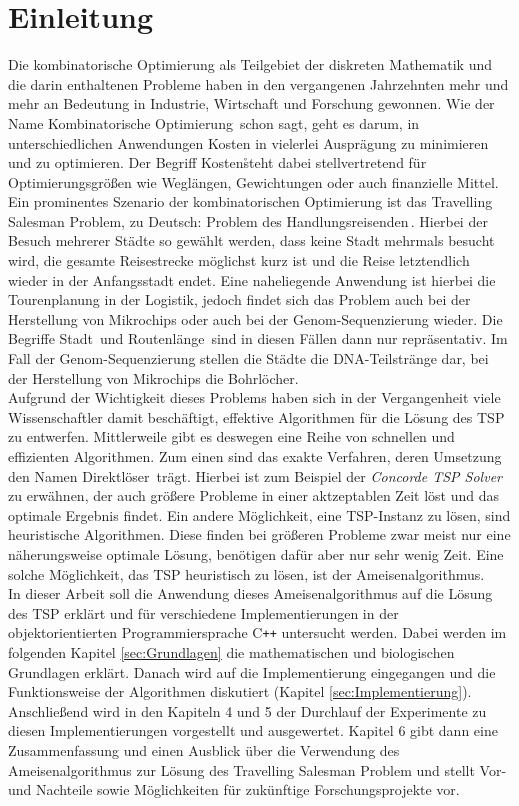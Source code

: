\documentclass[doktyp=barbeit, sprache=german]{TUBAFarbeiten}
\begin{document}
\section{Einleitung}
Die kombinatorische Optimierung als Teilgebiet der diskreten Mathematik und die darin enthaltenen Probleme haben in den vergangenen Jahrzehnten mehr und mehr an Bedeutung in Industrie, Wirtschaft und Forschung gewonnen. Wie der Name \glqq Kombinatorische Optimierung\grqq\, schon sagt, geht es darum, in unterschiedlichen Anwendungen Kosten in vielerlei Ausprägung zu minimieren und zu optimieren. Der Begriff \glqq Kosten\grqq\r steht dabei stellvertretend für Optimierungsgrößen wie Weglängen, Gewichtungen oder auch finanzielle Mittel.
\\Ein prominentes Szenario der kombinatorischen Optimierung ist das Travelling Salesman Problem, zu Deutsch: \glqq Problem des Handlungsreisenden\grqq\,. Hierbei der Besuch mehrerer Städte so gewählt werden, dass keine Stadt mehrmals besucht wird, die gesamte Reisestrecke möglichst kurz ist und die Reise letztendlich wieder in der Anfangsstadt endet. Eine naheliegende Anwendung ist hierbei die Tourenplanung in der Logistik, jedoch findet sich das Problem auch bei der Herstellung von Mikrochips \cite{Microchip} oder auch bei der Genom-Sequenzierung \cite{DNA} wieder. Die Begriffe \glqq Stadt\grqq\, und \glqq Routenlänge\grqq\, sind in diesen Fällen dann nur repräsentativ. Im Fall der Genom-Sequenzierung stellen die Städte die DNA-Teilstränge dar, bei der Herstellung von Mikrochips die Bohrlöcher.
\\Aufgrund der Wichtigkeit dieses Problems haben sich in der Vergangenheit viele Wissenschaftler damit beschäftigt, effektive Algorithmen für die Lösung des TSP zu entwerfen. Mittlerweile gibt es deswegen eine Reihe von schnellen und effizienten Algorithmen. Zum einen sind das exakte Verfahren, deren Umsetzung den Namen \glqq Direktlöser\grqq\, trägt. Hierbei ist zum Beispiel der \textit{Concorde TSP Solver} \cite{ConcordeMain} zu erwähnen, der auch größere Probleme in einer aktzeptablen Zeit löst und das optimale Ergebnis findet. Ein andere Möglichkeit, eine TSP-Instanz zu lösen, sind heuristische Algorithmen. Diese finden bei größeren Probleme zwar meist nur eine näherungsweise optimale Lösung, benötigen dafür aber nur sehr wenig Zeit. Eine solche Möglichkeit, das TSP heuristisch zu lösen, ist der Ameisenalgorithmus.
\\In dieser Arbeit soll die Anwendung dieses Ameisenalgorithmus auf die Lösung des TSP erklärt und für verschiedene Implementierungen in der objektorientierten Programmiersprache C\texttt{++} untersucht werden. Dabei werden im folgenden Kapitel \ref{sec:Grundlagen} die mathematischen und biologischen Grundlagen erklärt. Danach wird auf die Implementierung eingegangen und die Funktionsweise der Algorithmen diskutiert (Kapitel \ref{sec:Implementierung}). Anschließend wird in den Kapiteln 4 und 5 der Durchlauf der Experimente zu diesen Implementierungen vorgestellt und ausgewertet. Kapitel 6 gibt dann eine Zusammenfassung und einen Ausblick über die Verwendung des Ameisenalgorithmus zur Lösung des Travelling Salesman Problem und stellt Vor- und Nachteile sowie Möglichkeiten für zukünftige Forschungsprojekte vor.
\newpage
\end{document}
